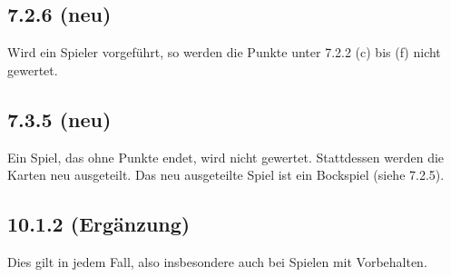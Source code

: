 \subsection*{7.2.6 (neu)}

Wird ein Spieler vorgeführt, so werden die Punkte unter 7.2.2 (c) bis
(f) nicht gewertet.

\subsection*{7.3.5 (neu)}

Ein Spiel, das ohne Punkte endet, wird nicht gewertet. Stattdessen
werden die Karten neu ausgeteilt. Das neu ausgeteilte Spiel ist ein
Bockspiel (siehe 7.2.5).

\subsection*{10.1.2 (Ergänzung)}

Dies gilt in jedem Fall, also insbesondere auch bei Spielen mit
Vorbehalten.






